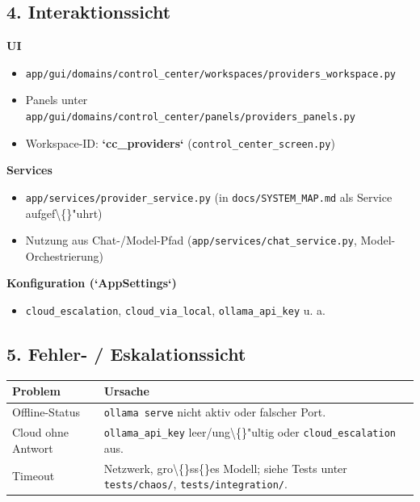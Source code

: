 \subsection{4. Interaktionssicht}

\textbf{UI}

\begin{itemize}
\item \texttt{app/gui/domains/control\_center/workspaces/providers\_workspace.py}
\item Panels unter \texttt{app/gui/domains/control\_center/panels/providers\_panels.py}
\item Workspace-ID: \textbf{`cc\_providers`} (\texttt{control\_center\_screen.py})
\end{itemize}

\textbf{Services}

\begin{itemize}
\item \texttt{app/services/provider\_service.py} (in \texttt{docs/SYSTEM\_MAP.md} als Service aufgef\textbackslash\{\}"uhrt)
\item Nutzung aus Chat-/Model-Pfad (\texttt{app/services/chat\_service.py}, Model-Orchestrierung)
\end{itemize}

\textbf{Konfiguration (`AppSettings`)}

\begin{itemize}
\item \texttt{cloud\_escalation}, \texttt{cloud\_via\_local}, \texttt{ollama\_api\_key} u. a.
\end{itemize}

\subsection{5. Fehler- / Eskalationssicht}

\begin{center}
\begin{tabular}{ll}
\hline
Problem & Ursache \\
\hline
Offline-Status & \texttt{ollama serve} nicht aktiv oder falscher Port. \\
Cloud ohne Antwort & \texttt{ollama\_api\_key} leer/ung\textbackslash\{\}"ultig oder \texttt{cloud\_escalation} aus. \\
Timeout & Netzwerk, gro\textbackslash\{\}ss\{\}es Modell; siehe Tests unter \texttt{tests/chaos/}, \texttt{tests/integration/}. \\
\hline
\end{tabular}
\end{center}

